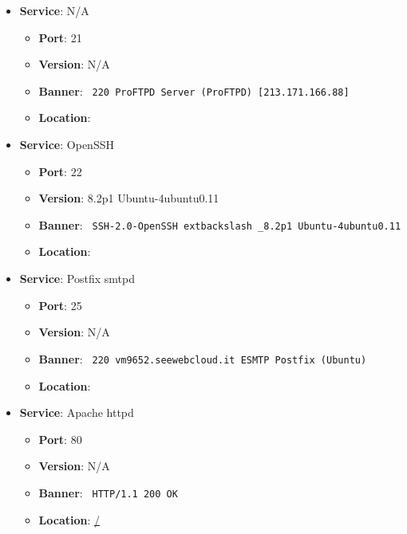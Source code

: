\documentclass{article}
\begin{document}
\begin{itemize}
    
        \item \textbf{Service}: N/A
        \begin{itemize}
            \item \textbf{Port}: 21
            \item \textbf{Version}:  N/A 
            \item \textbf{Banner}: \texttt{ 220 ProFTPD Server (ProFTPD) [213.171.166.88]
 }
            \item \textbf{Location}: \href{  }{  }
        \end{itemize}
    
        \item \textbf{Service}: OpenSSH
        \begin{itemize}
            \item \textbf{Port}: 22
            \item \textbf{Version}:  8.2p1 Ubuntu-4ubuntu0.11 
            \item \textbf{Banner}: \texttt{ SSH-2.0-OpenSSH	extbackslash _8.2p1 Ubuntu-4ubuntu0.11 }
            \item \textbf{Location}: \href{  }{  }
        \end{itemize}
    
        \item \textbf{Service}: Postfix smtpd
        \begin{itemize}
            \item \textbf{Port}: 25
            \item \textbf{Version}:  N/A 
            \item \textbf{Banner}: \texttt{ 220 vm9652.seewebcloud.it ESMTP Postfix (Ubuntu)
 }
            \item \textbf{Location}: \href{  }{  }
        \end{itemize}
    
        \item \textbf{Service}: Apache httpd
        \begin{itemize}
            \item \textbf{Port}: 80
            \item \textbf{Version}:  N/A 
            \item \textbf{Banner}: \texttt{ HTTP/1.1 200 OK
 }
            \item \textbf{Location}: \href{ / }{ / }
        \end{itemize}
    

\end{itemize}
\end{document}
